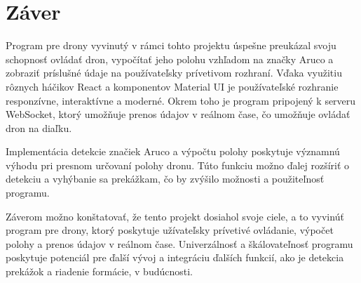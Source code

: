 \section{Z\'aver}


Program pre drony vyvinutý v rámci tohto projektu úspešne preukázal svoju schopnosť ovládať dron, vypočítať jeho polohu vzhľadom na značky Aruco a zobraziť príslušné údaje na používateľsky prívetivom rozhraní. Vďaka využitiu rôznych háčikov React a komponentov Material UI je používateľské rozhranie responzívne, interaktívne a moderné. Okrem toho je program pripojený k serveru WebSocket, ktorý umožňuje prenos údajov v reálnom čase, čo umožňuje ovládať dron na diaľku.

Implementácia detekcie značiek Aruco a výpočtu polohy poskytuje významnú výhodu pri presnom určovaní polohy dronu. Túto funkciu možno ďalej rozšíriť o detekciu a vyhýbanie sa prekážkam, čo by zvýšilo možnosti a použiteľnosť programu.

Záverom možno konštatovať, že tento projekt dosiahol svoje ciele, a to vyvinúť program pre drony, ktorý poskytuje užívateľsky prívetivé ovládanie, výpočet polohy a prenos údajov v reálnom čase. Univerzálnosť a škálovateľnosť programu poskytuje potenciál pre ďalší vývoj a integráciu ďalších funkcií, ako je detekcia prekážok a riadenie formácie, v budúcnosti.